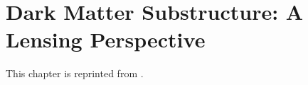\chapter{Dark Matter Substructure: A Lensing Perspective}\label{chap:alp}
This chapter is reprinted from .\nocite{gannon2025dark} 
